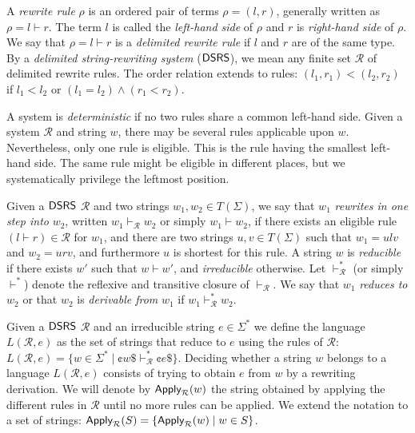 A \emph{rewrite rule} $\rho$ is an ordered pair of terms $\rho = (l, r)$, generally written as $\rho = l \vdash r$. The term $l$ is called the \emph{left-hand side} of $\rho$ and $r$ is \emph{right-hand side} of $\rho$. We say that $\rho = l \vdash r$ is a \emph{delimited rewrite rule} if $l$ and $r$ are of the same type. By a \emph{delimited string-rewriting system} ($\textup{\sf DSRS}$), we mean any finite set $\mathcal{R}$ of delimited rewrite rules. The order relation extends to rules: $(l_1, r_1) < (l_2, r_2)$ if $l_1 < l_2$ or $(l_1 = l_2) \wedge (r_1 < r_2)$.

A system is \emph{deterministic} if no two rules share a common left-hand side. Given a system $\mathcal{R}$ and string $w$, there may be several rules applicable upon $w$. Nevertheless, only one rule is eligible. This is the rule having the smallest left-hand side. The same rule might be eligible in different places, but we systematically privilege the leftmost position.

Given a $\textup{\sf DSRS}$ $\mathcal{R}$ and two strings $w_1, w_2 \in T(\Sigma)$, we say that $w_1$ \emph{rewrites in one step into} $w_2$, written $w_1 \vdash_{\mathcal{R}} w_2$ or simply $w_1 \vdash w_2$, if there exists an eligible rule $(l \vdash r) \in \mathcal{R}$ for $w_1$, and there are two strings $u, v \in T(\Sigma)$ such that $w_1 = ulv$ and $w_2 = urv$, and furthermore $u$ is shortest for this rule. A string $w$ is \emph{reducible} if there exists $w'$ such that $w \vdash w'$, and \emph{irreducible} otherwise. Let $\vdash_{\mathcal{R}}^* $ (or simply $\vdash^*$) denote the reflexive and transitive closure of $\vdash_{\mathcal{R}}$. We say that $w_1$ \emph{reduces to} $w_2$ or that $w_2$ is \emph{derivable from} $w_1$ if $w_1 \vdash_{\mathcal{R}}^* w_2$.

Given a $\textup{\sf DSRS}$ $\mathcal{R}$ and an irreducible string $e \in \Sigma^*$ we define the language $L(\mathcal{R}, e)$ as the set of strings that reduce to $e$ using the rules of $\mathcal{R}$: $L(\mathcal{R}, e) = \{ w \in \Sigma^* \mid \cent w \$ \vdash_{\mathcal{R}}^* \cent e \$ \}.$ Deciding whether a string $w$ belongs to a language $L(\mathcal{R}, e)$ consists of trying to obtain $e$ from $w$ by a rewriting derivation. We will denote by \index{$\Apply$}$\textup{\sf Apply}_{\mathcal{R}}(w)$ the string obtained by applying the different rules in $\mathcal{R}$ until no more rules can be applied. We extend the notation to a set of strings: $\textup{\sf Apply}_{\mathcal{R}}(S) = \{\textup{\sf Apply}_{\mathcal{R}}(w) \mid w \in S\}$.

